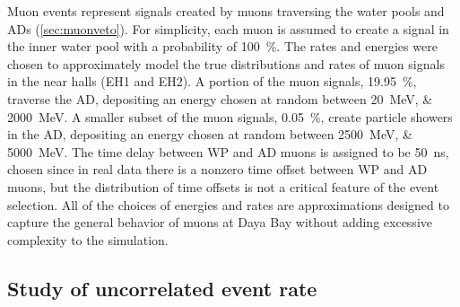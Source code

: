 Muon events represent signals created by muons traversing
the water pools and ADs (\cref{sec:muonveto}).
For simplicity, each muon is assumed to create a signal
in the inner water pool with a probability of \SI{100}{\percent}.
The rates and energies were chosen to approximately model
the true distributions and rates of muon signals in the near halls (EH1 and EH2).
A portion of the muon signals, \SI{19.95}{\percent},
traverse the AD, depositing an energy chosen at random between
\SIlist{20;2000}{\MeV}.
A smaller subset of the muon signals, \SI{0.05}{\percent},
create particle showers in the AD, depositing an energy chosen at random between
\SIlist{2500;5000}{\MeV}.
The time delay between WP and AD muons is assigned to be \SI{50}{\ns},
chosen since in real data there is a nonzero time offset between WP and AD muons,
but the distribution of time offsets
is not a critical feature of the event selection.
All of the choices of energies and rates are approximations
designed to capture the general behavior of muons at Daya Bay
without adding excessive complexity to the simulation.

\subsection{Study of uncorrelated event rate}

